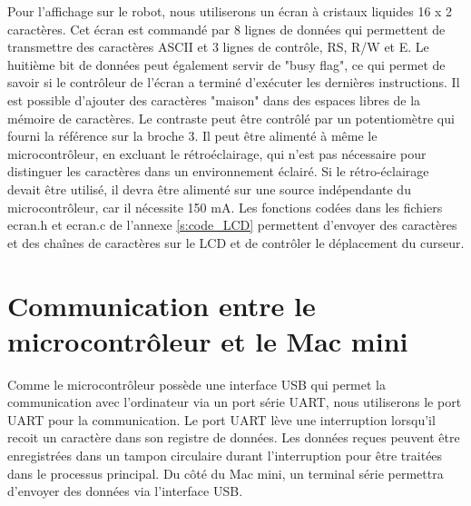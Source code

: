 Pour l'affichage sur le robot, nous utiliserons un écran à cristaux liquides 16 x 2  caractères. Cet écran est commandé par 8 lignes de données qui permettent de transmettre des caractères ASCII et 3 lignes de contrôle, RS, R/W et E. Le huitième bit de données peut également servir de "busy flag", ce qui permet de savoir si le contrôleur de l'écran a terminé d'exécuter les dernières instructions. Il est possible d'ajouter des caractères "maison" dans des espaces libres de la mémoire de caractères. Le contraste peut être contrôlé par un potentiomètre qui fourni la référence sur la broche 3. Il peut être alimenté à même le microcontrôleur, en excluant le rétroéclairage, qui n'est pas nécessaire pour distinguer les caractères dans un environnement éclairé. Si le rétro-éclairage devait être utilisé, il devra être alimenté sur une source indépendante du microcontrôleur, car il nécessite 150 mA. Les fonctions codées dans les fichiers ecran.h et ecran.c de l'annexe \ref{s:code_LCD} permettent d'envoyer des caractères et des chaînes de caractères sur le LCD et de contrôler le déplacement du curseur.

\section{Communication entre le microcontrôleur et le Mac mini} \label{s:comm_mac_micro}

Comme le microcontrôleur possède une interface USB qui permet la communication avec l'ordinateur via un port série UART, nous utiliserons le port UART pour la communication. Le port UART lève une interruption lorsqu'il recoit un caractère dans son registre de données. Les données reçues peuvent être enregistrées dans un tampon circulaire durant l'interruption pour être traitées dans le processus principal. Du côté du Mac mini, un terminal série permettra d'envoyer des données via l'interface USB. 

